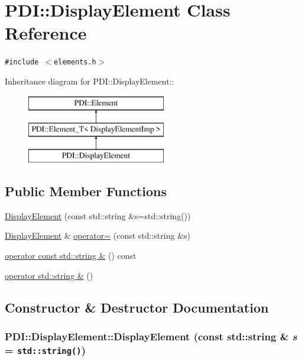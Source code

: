 \hypertarget{class_p_d_i_1_1_display_element}{
\section{PDI::DisplayElement Class Reference}
\label{class_p_d_i_1_1_display_element}
}
{\tt \#include $<$elements.h$>$}

Inheritance diagram for PDI::DisplayElement::\begin{figure}[H]
\begin{center}
\leavevmode
\includegraphics[height=3cm]{class_p_d_i_1_1_display_element}
\end{center}
\end{figure}
\subsection*{Public Member Functions}
\begin{CompactItemize}
\item 
\hyperlink{class_p_d_i_1_1_display_element_e4c0cc6ec26fa29bbac5c981e4a2397f}{DisplayElement} (const std::string \&s=std::string())
\item 
\hyperlink{class_p_d_i_1_1_display_element}{DisplayElement} \& \hyperlink{class_p_d_i_1_1_display_element_fe9c487c7364aeb5d0dcef22890ca8ad}{operator=} (const std::string \&s)
\item 
\hyperlink{class_p_d_i_1_1_display_element_c02068a967a182c0bf68a9200160329e}{operator const std::string \&} () const 
\item 
\hyperlink{class_p_d_i_1_1_display_element_9a1121388cac26aa246605ef60256b81}{operator std::string \&} ()
\end{CompactItemize}


\subsection{Constructor \& Destructor Documentation}
\hypertarget{class_p_d_i_1_1_display_element_e4c0cc6ec26fa29bbac5c981e4a2397f}{
\subsubsection[{DisplayElement}]{\setlength{\rightskip}{0pt plus 5cm}PDI::DisplayElement::DisplayElement (const std::string \& {\em s} = {\tt std::string()})}}
\label{class_p_d_i_1_1_display_element_e4c0cc6ec26fa29bbac5c981e4a2397f}




